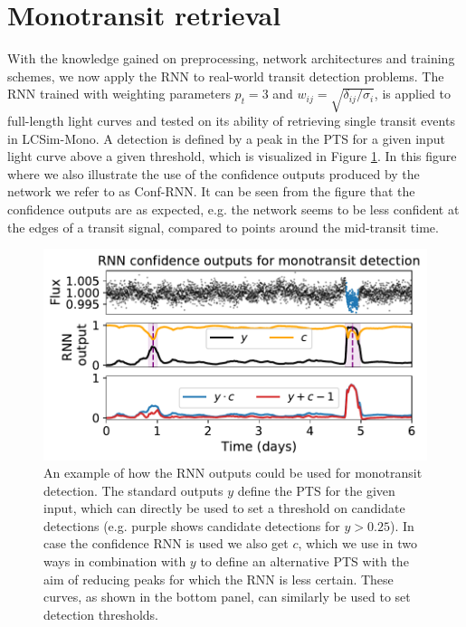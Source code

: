 \section{Monotransit retrieval}
\label{sec:monos}

With the knowledge gained on preprocessing, network architectures and training schemes, we now apply the RNN to real-world transit detection problems. The RNN trained with weighting parameters $p_t=3$ and $w_{ij} = \sqrt{\delta_{ij}/\sigma_i}$, is applied to full-length light curves and tested on its ability of retrieving single transit events in LCSim-Mono. A detection is defined by a peak in the PTS for a given input light curve above a given threshold, which is visualized in Figure \ref{fig:mono_example}. In this figure where we also illustrate the use of the confidence outputs produced by the network we refer to as Conf-RNN. It can be seen from the figure that the confidence outputs are as expected, e.g. the network seems to be less confident at the edges of a transit signal, compared to points around the mid-transit time.

\begin{figure}
    \centering
    \includegraphics[width=0.5\linewidth]{Experiments/Figures/Monos/mono_example.pdf}
    \caption{An example of how the RNN outputs could be used for monotransit detection. The standard outputs $y$ define the PTS for the given input, which can directly be used to set a threshold on candidate detections (e.g. purple shows candidate detections for $y >0.25$). In case the confidence RNN is used we also get $c$, which we use in two ways in combination with $y$ to define an alternative PTS with the aim of reducing peaks for which the RNN is less certain. These curves, as shown in the bottom panel, can similarly be used to set detection thresholds.}
    \label{fig:mono_example}
\end{figure}

